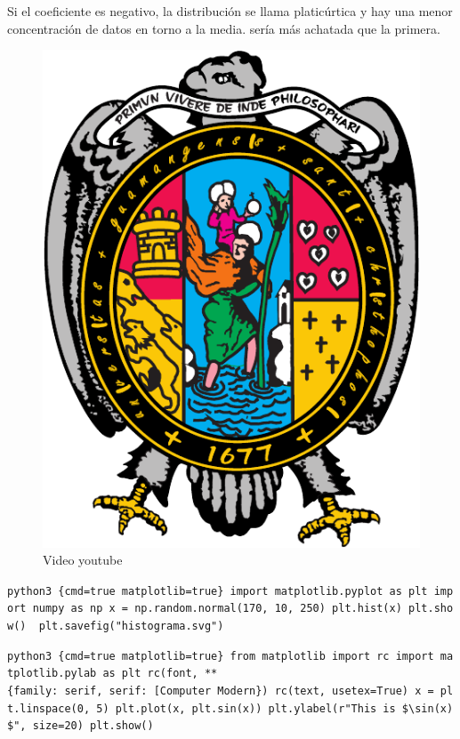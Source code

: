 \documentclass[10pt,]{krantz}
\theoremstyle{definition}
\theoremstyle{definition}
\theoremstyle{definition}
\theoremstyle{definition}
\theoremstyle{remark}
\begin{document}
Si el coeficiente es negativo, la distribución se llama platicúrtica y hay una menor concentración de datos en torno a la media. sería más achatada que la primera.

\begin{figure}[!ht]

{\centering \includegraphics[width=1\linewidth]{U} 

}

\caption{Video youtube}\label{fig:Doge}
\end{figure}

\texttt{python3\ \{cmd=true\ matplotlib=true\}\ import\ matplotlib.pyplot\ as\ plt\ import\ numpy\ as\ np\ x\ =\ np.random.normal(170,\ 10,\ 250)\ plt.hist(x)\ plt.show()\ \ plt.savefig("histograma.svg")}

\texttt{python3\ \{cmd=true\ matplotlib=true\}\ from\ matplotlib\ import\ rc\ import\ matplotlib.pylab\ as\ plt\ rc(\textquotesingle{}font\textquotesingle{},\ **\{\textquotesingle{}family\textquotesingle{}:\ \textquotesingle{}serif\textquotesingle{},\ \textquotesingle{}serif\textquotesingle{}:\ {[}\textquotesingle{}Computer\ Modern\textquotesingle{}{]}\})\ rc(\textquotesingle{}text\textquotesingle{},\ usetex=True)\ x\ =\ plt.linspace(0,\ 5)\ plt.plot(x,\ plt.sin(x))\ plt.ylabel(r"This\ is\ \$\textbackslash{}sin(x)\$",\ size=20)\ plt.show()}
\end{document}

